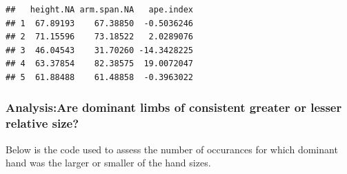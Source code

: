 \documentclass[]{article}
\newenvironment{Shaded}{\begin{snugshade}}{\end{snugshade}}
\newcommand{\CommentTok}[1]{\textcolor[rgb]{0.56,0.35,0.01}{\textit{#1}}}
\newcommand{\DataTypeTok}[1]{\textcolor[rgb]{0.13,0.29,0.53}{#1}}
\newcommand{\DecValTok}[1]{\textcolor[rgb]{0.00,0.00,0.81}{#1}}
\newcommand{\KeywordTok}[1]{\textcolor[rgb]{0.13,0.29,0.53}{\textbf{#1}}}
\newcommand{\NormalTok}[1]{#1}
\newcommand{\OperatorTok}[1]{\textcolor[rgb]{0.81,0.36,0.00}{\textbf{#1}}}
\newcommand{\StringTok}[1]{\textcolor[rgb]{0.31,0.60,0.02}{#1}}
\begin{document}
\begin{verbatim}
##   height.NA arm.span.NA   ape.index
## 1  67.89193    67.38850  -0.5036246
## 2  71.15596    73.18522   2.0289076
## 3  46.04543    31.70260 -14.3428225
## 4  63.37854    82.38575  19.0072047
## 5  61.88488    61.48858  -0.3963022
\end{verbatim}

\begin{Shaded}
\end{Shaded}

\newpage
\subsubsection{Analysis:Are dominant limbs of consistent greater or lesser relative size?}
\label{sec:anrq3}

Below is the code used to assess the number of occurances for which
dominant hand was the larger or smaller of the hand sizes.
\end{document}
